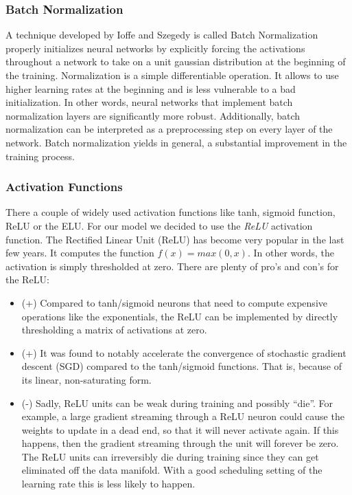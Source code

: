 \documentclass[journal]{IEEEtran}
\begin{document}
\subsubsection{Batch Normalization}
\noindent A technique developed by Ioffe and Szegedy \cite{RN4} is called Batch Normalization properly initializes neural networks by explicitly forcing the activations throughout a network to take on a unit gaussian distribution at the beginning of the training. Normalization is a simple differentiable operation. 
It allows to use higher learning rates at the beginning and is less vulnerable to a bad initialization. In other words, neural networks that implement batch normalization layers are significantly more robust. Additionally, batch normalization can be interpreted as a preprocessing step on every layer of the network. Batch normalization yields in general, a substantial improvement in the training process. \\
\subsubsection{Activation Functions}
\label{sec:activationFunctions}
\noindent There a couple of widely used activation functions like tanh, sigmoid function, ReLU or the ELU. For our model we decided to use the \textit{ReLU} activation function. The Rectified Linear Unit (ReLU) has become very popular in the last few years. It computes the function \(f(x)=max(0,x)\). In other words, the activation is simply thresholded at zero. There are plenty of pro's and con's for the ReLU:
\begin{itemize}
\item (+) Compared to tanh/sigmoid neurons that need to compute expensive operations  like the exponentials, the ReLU can be implemented by directly thresholding a matrix of activations at zero.
\item (+) It was found to notably accelerate the convergence of stochastic gradient descent (SGD) compared to the tanh/sigmoid functions. That is, because of its linear, non-saturating form.
\item (-) Sadly, ReLU units can be weak during training and possibly “die”. For example, a large gradient streaming through a ReLU neuron could cause the weights to update in a dead end, so that it will never activate again. If this happens, then the gradient streaming through the unit will forever be zero. The ReLU units can irreversibly die during training since they can get eliminated off the data manifold. With a good scheduling setting of the learning rate this is less likely to happen. \\
\end{itemize}
\end{document}
